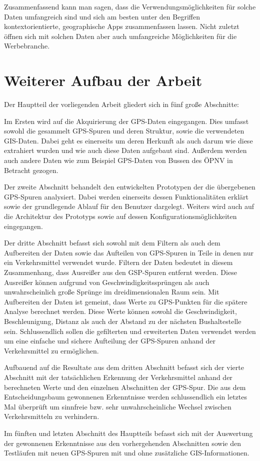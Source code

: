 Zusammenfassend kann man sagen, dass die Verwendungsmöglichkeiten für solche Daten umfangreich sind und sich am besten unter den Begriffen kontextorientierte, geographische Apps zusammenfassen lassen. Nicht zuletzt öffnen sich mit solchen Daten aber auch umfangreiche Möglichkeiten für die Werbebranche.

\section{Weiterer Aufbau der Arbeit}
Der Hauptteil der vorliegenden Arbeit gliedert sich in fünf große Abschnitte:

Im Ersten wird auf die Akquirierung der GPS-Daten eingegangen. Dies umfasst sowohl die gesammelt GPS-Spuren und deren Struktur, sowie die verwendeten GIS-Daten. Dabei geht es einerseits um deren Herkunft als auch darum wie diese extrahiert wurden und wie auch diese Daten aufgebaut sind. Außerdem werden auch andere Daten wie zum Beispiel GPS-Daten von Bussen des ÖPNV in Betracht gezogen.

Der zweite Abschnitt behandelt den entwickelten Prototypen der die übergebenen GPS-Spuren analysiert. Dabei werden einerseits dessen Funktionalitäten erklärt sowie der grundlegende Ablauf für den Benutzer dargelegt. Weiters wird auch auf die Architektur des Prototyps sowie auf dessen Konfigurationsmöglichkeiten eingegangen.

Der dritte Abschnitt befasst sich sowohl mit dem Filtern als auch dem Aufbereiten der Daten sowie das Aufteilen von GPS-Spuren in Teile in denen nur ein Verkehrsmittel verwendet wurde. Filtern der Daten bedeutet in diesem Zusammenhang, dass Ausreißer aus den GSP-Spuren entfernt werden. Diese Ausreißer können aufgrund von Geschwindigkeitssprüngen als auch unwahrscheinlich große Sprünge im dreidimensionalen Raum sein. Mit Aufbereiten der Daten ist gemeint, dass Werte zu GPS-Punkten für die spätere Analyse berechnet werden. Diese Werte können sowohl die Geschwindigkeit, Beschleunigung, Distanz als auch der Abstand zu der nächsten Bushaltestelle sein. Schlussendlich sollen die gefilterten und erweiterten Daten verwendet werden um eine einfache und sichere Aufteilung der GPS-Spuren anhand der Verkehrsmittel zu ermöglichen.

Aufbauend auf die Resultate aus dem dritten Abschnitt befasst sich der vierte Abschnitt mit der tatsächlichen Erkennung der Verkehrsmittel anhand der berechneten Werte und den einzelnen Abschnitten der GPS-Spur. Die aus dem Entscheidungsbaum gewonnenen Erkenntnisse werden schlussendlich ein letztes Mal überprüft um sinnfreie bzw. sehr unwahrscheinliche Wechsel zwischen Verkehrsmitteln zu verhindern.

Im fünften und letzten Abschnitt des Hauptteils befasst sich mit der Auswertung der gewonnenen Erkenntnisse aus den vorhergehenden Abschnitten sowie den Testläufen mit neuen GPS-Spuren mit und ohne zusätzliche GIS-Informationen.
